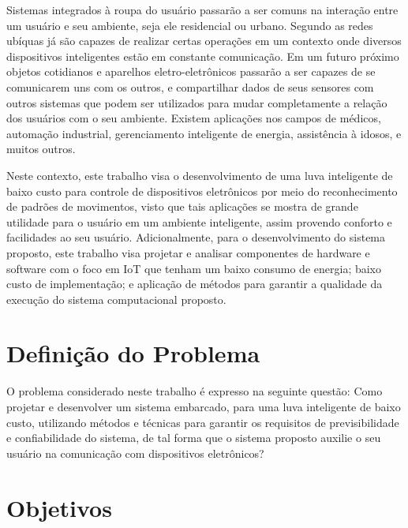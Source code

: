 Sistemas integrados à roupa do usuário passarão a ser comuns na interação entre um usuário e seu ambiente, seja ele residencial ou urbano. Segundo  as redes ubíquas já são capazes de realizar certas operações em um contexto onde diversos dispositivos inteligentes estão em constante comunicação. Em um futuro próximo objetos cotidianos e aparelhos eletro-eletrônicos passarão a ser capazes de se comunicarem uns com os outros, e compartilhar dados de seus sensores com outros sistemas que podem ser utilizados para mudar completamente a relação dos usuários com o seu ambiente. Existem aplicações nos campos de médicos, automação industrial, gerenciamento inteligente de energia, assistência à idosos, e muitos outros. \cite{iotct:2014}


Neste contexto, este trabalho visa o desenvolvimento de uma luva inteligente de baixo custo para controle de dispositivos eletrônicos por meio do reconhecimento de padrões de movimentos, visto que tais aplicações se mostra de grande utilidade para o usuário em um ambiente inteligente, assim provendo conforto e facilidades ao seu usuário. Adicionalmente, para o desenvolvimento do sistema proposto, este trabalho visa projetar e analisar componentes de hardware e software com o foco em IoT que tenham um baixo consumo de energia; baixo custo de implementação; e aplicação de métodos para garantir a qualidade da execução do sistema computacional proposto.


\section{Definição do Problema}

O problema considerado neste trabalho é expresso na seguinte questão: Como projetar e desenvolver um sistema embarcado, para uma luva inteligente de baixo custo, utilizando métodos e técnicas para garantir os requisitos de previsibilidade e confiabilidade do sistema, de tal forma que o sistema proposto auxilie o seu usuário na comunicação com dispositivos eletrônicos?




\section{Objetivos}

